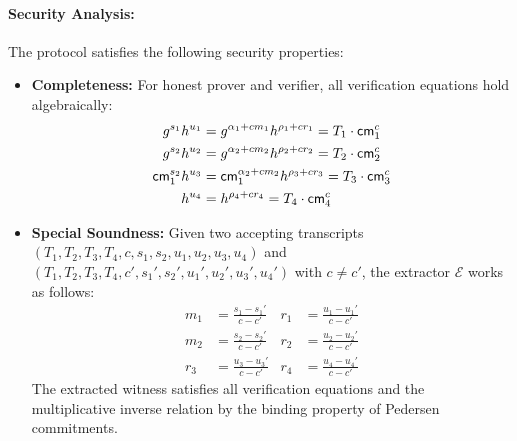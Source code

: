 \paragraph{Security Analysis:}
The protocol satisfies the following security properties:

\begin{itemize}
    \item \textbf{Completeness:} For honest prover and verifier, all verification equations hold algebraically:
    \begin{align*}
        g^{s_1}h^{u_1} &= g^{\alpha_1 + cm_1}h^{\rho_1 + cr_1} = T_1 \cdot \mathsf{cm}_1^c\\
        g^{s_2}h^{u_2} &= g^{\alpha_2 + cm_2}h^{\rho_2 + cr_2} = T_2 \cdot \mathsf{cm}_2^c\\
        \mathsf{cm}_1^{s_2}h^{u_3} &= \mathsf{cm}_1^{\alpha_2 + cm_2}h^{\rho_3 + cr_3} = T_3 \cdot \mathsf{cm}_3^c\\
        h^{u_4} &= h^{\rho_4 + cr_4} = T_4 \cdot \mathsf{cm}_4^c
    \end{align*}
    
    \item \textbf{Special Soundness:} Given two accepting transcripts $(T_1, T_2, T_3, T_4, c, s_1, s_2, u_1, u_2, u_3, u_4)$ and $(T_1, T_2, T_3, T_4, c', s_1', s_2', u_1', u_2', u_3', u_4')$ with $c \neq c'$, the extractor $\mathcal{E}$ works as follows:
    \begin{align*}
        m_1 &= \frac{s_1 - s_1'}{c - c'} &r_1 &= \frac{u_1 - u_1'}{c - c'}\\
        m_2 &= \frac{s_2 - s_2'}{c - c'} &r_2 &= \frac{u_2 - u_2'}{c - c'}\\
        r_3 &= \frac{u_3 - u_3'}{c - c'} &r_4 &= \frac{u_4 - u_4'}{c - c'}
    \end{align*}
    The extracted witness satisfies all verification equations and the multiplicative inverse relation by the binding property of Pedersen commitments.
    

\end{itemize}

